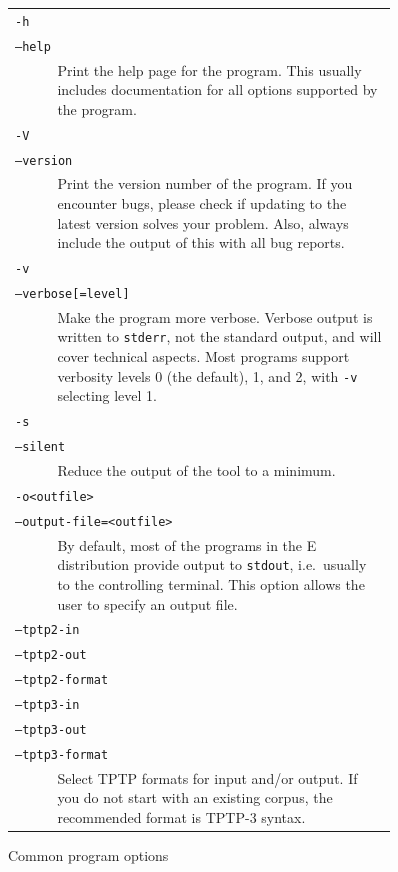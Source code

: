 \documentclass{report}
\begin{document}
\begin{figure}
  \small
  \centering
  \begin{tabular}{p{0.1\linewidth}p{0.8\linewidth}}
    \multicolumn{2}{l}{\texttt{-h}}\\
    \multicolumn{2}{l}{\texttt{--help}}\\
    & Print the help page for the program. This usually includes documentation for
    all options supported by the program.\\
    \multicolumn{2}{l}{\texttt{-V}}\\
    \multicolumn{2}{l}{\texttt{--version}}\\
    & Print the version number of the program. If you encounter bugs,
    please check if updating to the latest version solves your
    problem. Also, always include the output of this with all bug
    reports.\\
    \multicolumn{2}{l}{\texttt{-v}}\\
    \multicolumn{2}{l}{\texttt{--verbose[=level]}}\\
    & Make the program more verbose. Verbose output is written to
    \texttt{stderr}, not the standard output, and will cover technical
    aspects. Most programs support verbosity levels 0 (the default),
    1, and 2, with \texttt{-v} selecting level 1.\\
    \multicolumn{2}{l}{\texttt{-s}}\\
    \multicolumn{2}{l}{\texttt{--silent}}\\
    & Reduce the output of the tool to a minimum. \\
    \multicolumn{2}{l}{\texttt{-o<outfile>}}\\
    \multicolumn{2}{l}{\texttt{--output-file=<outfile>}}\\
    & By default, most of the programs in the E distribution provide
    output to \texttt{stdout}, i.e.\ usually to the controlling
    terminal. This option allows the user to specify an output
    file. \\
    \multicolumn{2}{l}{\texttt{--tptp2-in    }}\\
    \multicolumn{2}{l}{\texttt{--tptp2-out   }}\\
    \multicolumn{2}{l}{\texttt{--tptp2-format}}\\
    \multicolumn{2}{l}{\texttt{--tptp3-in    }}\\
    \multicolumn{2}{l}{\texttt{--tptp3-out   }}\\
    \multicolumn{2}{l}{\texttt{--tptp3-format}}\\
    & Select TPTP formats for input and/or output. If you do not start
    with an existing corpus, the recommended format is TPTP-3 syntax.\\
  \end{tabular}
  \caption{Common program options}
  \label{tab:opts}
\end{figure}
\end{document}
